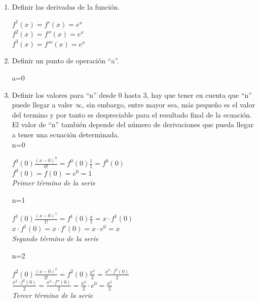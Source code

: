 \documentclass[a4paper,12pt,twoside]{proyectotanquesecci}
\begin{document}
\begin{enumerate}

\item Definir las derivadas de la función.
	\begin{center}
		$f^{1}\left( x\right) =f'\left( x\right) =e^{x}$\\
		$f^{2}\left( x\right) =f''\left( x\right) =e^{x}$\\
		$f^{3}\left( x\right) =f'''\left( x\right) =e^{x}$
	\end{center}
\item Definir un punto de operación “a”.
	\begin{center} a=0 \end{center}
\item Definir los valores para “n” desde 0 hasta 3, hay que tener en cuenta que “n” puede llegar a valer $\infty$, sin embargo, entre mayor sea, más pequeño es el valor del termino y por tanto es despreciable para el resultado final de la ecuación. El valor de “n” también depende del número de derivaciones que pueda llegar a tener una ecuación determinada.\\

	n=0
	\begin{center}
		$f^{0}\left( 0\right) \frac {\left( x-0\right) ^{0}}{0!}=f^{0}\left( 0\right) \frac {1}{1}=f^{0}\left( 0\right)$\\
		$f^{0}\left( 0\right) =f\left( 0\right) =e^{0}=1$ \\
		\textit{ Primer término de la serie }\\
	\end{center}
	
	n=1
	\begin{center}
		$f^{1}\left( 0\right) \frac {\left( x-0\right) ^{1}}{1!}=f^{1}\left( 0\right) \frac {x}{1}=x\cdot f^{1}\left( 0\right)$\\
		$x\cdot f^{1}\left( 0\right) =x\cdot f'\left( 0\right) =x\cdot e^{0}=x$\\
		\textit{ Segundo término de la serie }\\
	\end{center}
	
	n=2
	\begin{center}
		$f^{2}\left( 0\right) \frac {\left( x-0\right) ^{2}}{2!}=f^{2}\left( 0\right) \frac {x^{2}}{2}=\frac {x^{2}\cdot f^{2}\left( 0\right) }{2}$\\
		$\frac {x^{2}\cdot f^{2}\left( 0\right) }{2}=\frac {x^{2}\cdot f''\left( 0\right) }{2}=\frac {x^{2}}{2}\cdot e^{0}=\frac {x^{2}}{2}$\\
		\textit{ Tercer término de la serie }\\
	\end{center}
	

\end{enumerate}
\end{document}
